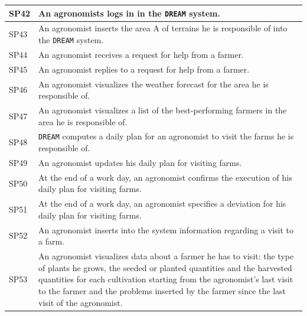 \documentclass{article}
\begin{document}
\begin{longtable}[c]{|m{0.75cm}|m{11cm}|}
 SP42 & An agronomists logs in in the \verb|DREAM| system.\\
 \hline
 SP43 & An agronomist inserts the area A of terrains he is responsible of into the \verb|DREAM| system.\\
 \hline
 SP44 & An agronomist receives a request for help from a farmer.\\
 \hline
 SP45 & An agronomist replies to a request for help from a farmer.\\
 \hline
 SP46 & An agronomist visualizes the weather forecast for the area he is responsible of.\\
 \hline
 SP47 & An agronomist visualizes a list of the best-performing farmers in the area he is responsible of.\\
 \hline
 SP48 & \verb|DREAM| computes a daily plan  for an agronomist to visit the farms he is responsible of.\\
 \hline
 SP49 & An agronomist updates his daily plan for visiting farms.\\
 \hline
 SP50 & At the end of a work day, an agronomist confirms the execution of his daily plan for visiting farms.\\
 \hline
 SP51 & At the end of a work day, an agronomist specifies a deviation for his daily plan for visiting farms.\\
 \hline
 SP52 & An agronomist inserts into the system information regarding a visit to a farm.\\
 \hline
 SP53 & An agronomist visualizes data about a farmer he has to visit: the type of plants he grows, the seeded or planted quantities and the harvested quantities for each cultivation starting from the agronomist's last visit to the farmer and the problems inserted by the farmer since the last visit of the agronomist.\\
 \hline
 \end{longtable}
\end{document}
